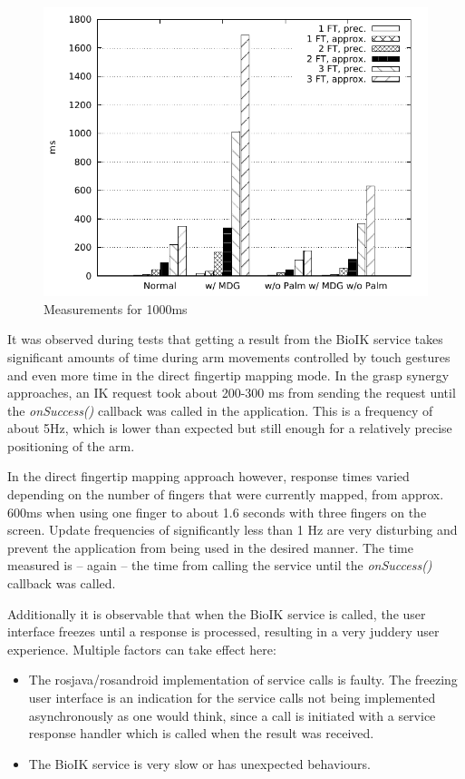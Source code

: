 \begin{figure}
	\caption{\label{fig:eval:1000ms}Measurements for 1000ms}
	\begin{center}
		\includegraphics{assets/chpt_eval/1000ms.pdf}
	\end{center}
\end{figure}


It was observed during tests that getting a result from the BioIK service takes significant amounts of time during arm movements controlled by touch gestures and even more time in the direct fingertip mapping mode. In the grasp synergy approaches, an IK request took about 200-300 ms from sending the request until the \textit{onSuccess()} callback was called in the application. This is a frequency of about 5Hz, which is lower than expected but still enough for a relatively precise positioning of the arm.

In the direct fingertip mapping approach however, response times varied depending on the number of fingers that were currently mapped, from approx. 600ms when using one finger to about 1.6 seconds with three fingers on the screen. Update frequencies of significantly less than 1 Hz are very disturbing and prevent the application from being used in the desired manner. The time measured is -- again -- the time from calling the service until the \textit{onSuccess()} callback was called. 

Additionally it is observable that when the BioIK service is called, the user interface freezes until a response is processed, resulting in a very juddery user experience. Multiple factors can take effect here:
\begin{itemize}
	\item The rosjava/rosandroid implementation of service calls is faulty. The freezing user interface is an indication for the service calls not being implemented asynchronously as one would think, since a call is initiated with a service response handler which is called when the result was received.
	\item The BioIK service is very slow or has unexpected behaviours.
\end{itemize}

